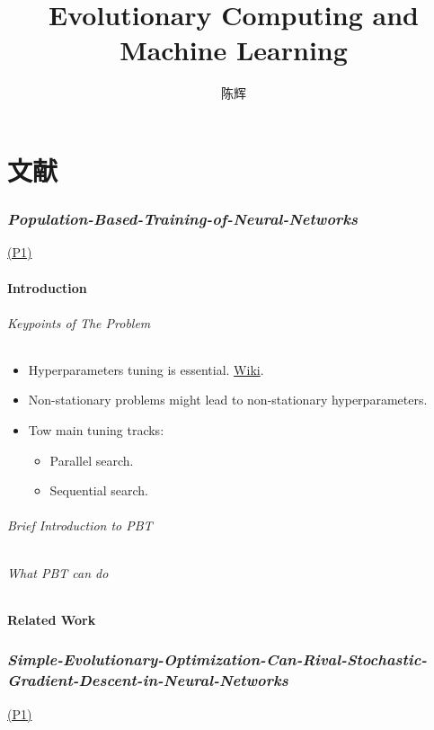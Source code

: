 \documentclass{article}
\title{Evolutionary Computing and Machine Learning}
\author{陈辉}
\date{}
\newcommand{\paper}[2]{\hyperlink{./papers/#1.pdf.#2}{(P#2)}}
\begin{document}
\maketitle
\tableofcontents
\newpage
\part{文献}
\section{\textit{Population-Based-Training-of-Neural-Networks}}
\paper{Population-Based-Training-of-Neural-Networks}{1}
\subsection{Introduction}
\paragraph{Keypoints of The Problem}

\begin{itemize}
		\item Hyperparameters tuning is essential.
		\href{https://en.wikipedia.org/wiki/Hyperparameter\_optimization}{Wiki}.
		\item Non-stationary problems might lead to non-stationary hyperparameters.
		\item Tow main tuning tracks:
\begin{itemize}
		\item Parallel search. 
		\item Sequential search.
\end{itemize}
\end{itemize}

\paragraph{Brief Introduction to PBT}
\paragraph{What PBT can do}

\subsection{Related Work}





\section{\textit{Simple-Evolutionary-Optimization-Can-Rival-Stochastic-Gradient-Descent-in-Neural-Networks}}
\paper{Simple-Evolutionary-Optimization-Can-Rival-Stochastic-Gradient-Descent-in-Neural-Networks}{1}
\end{document}
